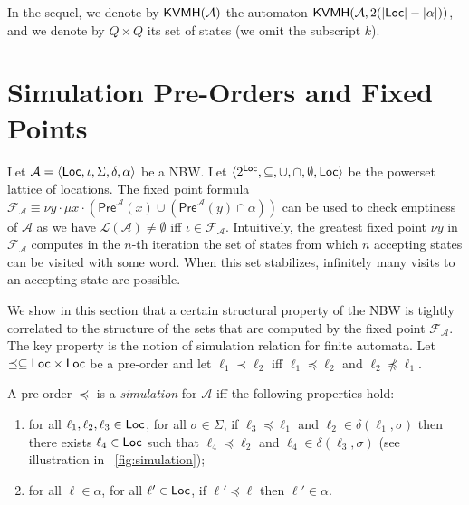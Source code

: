 \documentclass{LMCS}
\def\abs#1{\ensuremath{\lvert #1\rvert}}
\newcommand{\Pre}{\mathsf{Pre}}
\renewcommand{\l}{{\ell}}
\newcommand{\Loc}{{\sf Loc}}
\newcommand{\tuple}[1]{\langle #1 \rangle}
\newcommand{\A}{\mathcal{A}}
\newcommand{\F}{\mathcal{F}}
\renewcommand{\L}{\mathcal{L}}
\newcommand{\KVMH}{{\sf KVMH}}
\begin{document}
In the sequel, we denote by $\KVMH(\A)$ the automaton $\KVMH(\A,2(\abs{\Loc} - \abs{\alpha}))$,
and we denote by $Q \times Q$ its set of states (we omit the subscript $k$).

\section{Simulation Pre-Orders and Fixed Points}\label{sec:fixed-point}

Let $\A = \tuple{\Loc, \iota, \Sigma, \delta, \alpha}$ be a NBW.  Let
$\langle 2^{\Loc},\subseteq, \cup,\cap,\emptyset,\Loc \rangle$ be the
powerset lattice of locations. The fixed point formula
$\F_{\A} \equiv \nu y \cdot \mu x \cdot ( \Pre^{\A}(x) \cup ( \Pre^{\A}(y) \cap \alpha ))$
can be used to check emptiness of $\A$ as we have $\L(\A)\not= \emptyset$ iff $\iota \in \F_{\A}$.
Intuitively, the greatest fixed point $\nu y$ in $\F_{\A}$ computes in the
$n$-th iteration the set of states from which $n$ accepting states can be visited
with some word. When this set stabilizes, infinitely many visits to an accepting
state are possible.


We show in this section that a certain structural property of the NBW
is tightly correlated to the structure of the sets that are computed by the 
fixed point $\F_{\A}$. The key property is the notion of simulation relation
for finite automata. Let $\preceq \subseteq \Loc \times \Loc$ be a pre-order and let $\l_1
\prec \l_2$ iff $\l_1 \preceq \l_2$ and $\l_2 \not\preceq \l_1$.

\begin{defi}\label{def:simulation}
  A pre-order $\preceq$ is a \emph{simulation} for $\A$ iff the following
  properties hold:
  \begin{enumerate}[$\bullet$]
    
    \item for all $\l_1,\l_2,\l_3 \in \Loc$, for all $\sigma \in \Sigma$, if
    $\l_3 \preceq \l_1$ and $\l_2 \in \delta(\l_1,\sigma)$ then there exists
    $\l_4 \in \Loc$ such that $\l_4 \preceq \l_2$ and $\l_4 \in \delta(\l_3,\sigma)$ (see illustration in \figurename~\ref{fig:simulation});

    \item for all $\l \in \alpha$, for all $\l' \in \Loc$, if $\l' \preceq \l$ 
     then $\l' \in \alpha$.

  \end{enumerate}
\end{defi}
\end{document}
